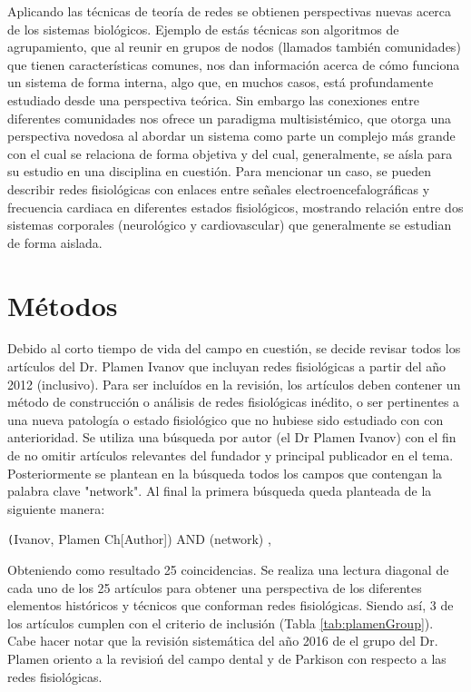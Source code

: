 \documentclass[twoside,twocolumn]{article}
\begin{document}
Aplicando las técnicas de teoría de redes se obtienen perspectivas nuevas acerca de los sistemas biológicos.
Ejemplo de estás técnicas son algoritmos de agrupamiento, que al reunir en grupos de nodos (llamados también comunidades) que tienen características comunes, nos dan información acerca de cómo funciona un sistema de forma interna, algo que, en muchos casos, está profundamente estudiado desde una perspectiva teórica.
Sin embargo las conexiones entre diferentes comunidades nos ofrece un paradigma multisistémico, que otorga una perspectiva novedosa al abordar un sistema como parte un complejo más grande con el cual se relaciona de forma objetiva y del cual, generalmente, se aísla para su estudio en una disciplina en cuestión.
Para mencionar un caso, se pueden describir redes fisiológicas con enlaces entre señales electroencefalográficas y frecuencia cardiaca en diferentes estados fisiológicos, mostrando relación entre dos sistemas corporales (neurológico y cardiovascular) que generalmente se estudian de forma aislada.


\section{Métodos}
Debido al corto tiempo de vida del campo en cuestión, se decide revisar todos los artículos del Dr. Plamen Ivanov que incluyan redes fisiológicas a partir del año 2012 (inclusivo).
Para ser incluídos en la revisión, los artículos deben contener un método de construcción o análisis de redes fisiológicas inédito, o ser pertinentes a una nueva patología o estado fisiológico que no hubiese sido estudiado con con anterioridad.
Se utiliza una búsqueda por autor (el Dr Plamen Ivanov) con el fin de no omitir artículos relevantes del fundador y principal publicador en el tema. Posteriormente se plantean en la búsqueda todos los campos que contengan la palabra clave "network". Al final la primera búsqueda queda planteada de la siguiente manera:

\texttt(Ivanov, Plamen Ch[Author]) AND (network) ,

Obteniendo como resultado 25 coincidencias. Se realiza una lectura diagonal de cada uno de los 25 artículos para obtener una perspectiva de los diferentes elementos históricos y técnicos que conforman redes fisiológicas.
Siendo así, 3 de los artículos cumplen con el criterio de inclusión (Tabla \ref{tab:plamenGroup}). Cabe hacer notar que la revisión sistemática del año 2016 de el grupo del Dr. Plamen\cite{ivanov2016focus} oriento a la revisioń del campo dental\cite{scala2014complex} y de Parkison\cite{monti2018network} con respecto a las redes fisiológicas.
\end{document}
